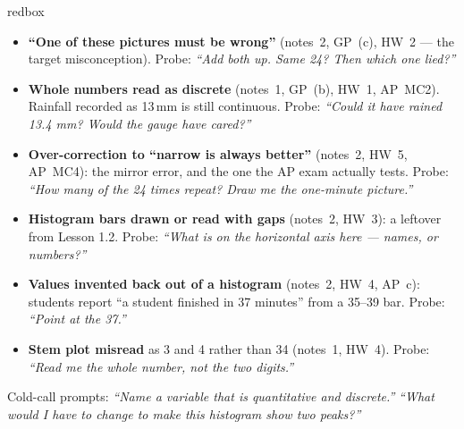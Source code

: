\documentclass[10pt]{article}
\begin{document}
\boxguard
\begin{skillbox}{redbox}
\begin{itemize}[leftmargin=1.2em, nosep]
  \item \textbf{``One of these pictures must be wrong''} (notes~2, GP~(c), HW~2 --- the target
        misconception). Probe: \emph{``Add both up. Same 24? Then which one lied?''}
  \item \textbf{Whole numbers read as discrete} (notes~1, GP~(b), HW~1, AP~MC2). Rainfall
        recorded as 13\,mm is still continuous. Probe: \emph{``Could it have rained 13.4 mm?
        Would the gauge have cared?''}
  \item \textbf{Over-correction to ``narrow is always better''} (notes~2, HW~5, AP~MC4):
        the mirror error, and the one the AP exam actually tests. Probe: \emph{``How many of the
        24 times repeat? Draw me the one-minute picture.''}
  \item \textbf{Histogram bars drawn or read with gaps} (notes~2, HW~3): a leftover from Lesson
        1.2. Probe: \emph{``What is on the horizontal axis here --- names, or numbers?''}
  \item \textbf{Values invented back out of a histogram} (notes~2, HW~4, AP~c): students
        report ``a student finished in 37 minutes'' from a 35--39 bar. Probe: \emph{``Point at
        the 37.''}
  \item \textbf{Stem plot misread} as 3 and 4 rather than 34 (notes~1, HW~4). Probe:
        \emph{``Read me the whole number, not the two digits.''}
\end{itemize}
Cold-call prompts: \emph{``Name a variable that is quantitative and discrete.''} \quad
\emph{``What would I have to change to make this histogram show two peaks?''}
\end{skillbox}
\end{document}
